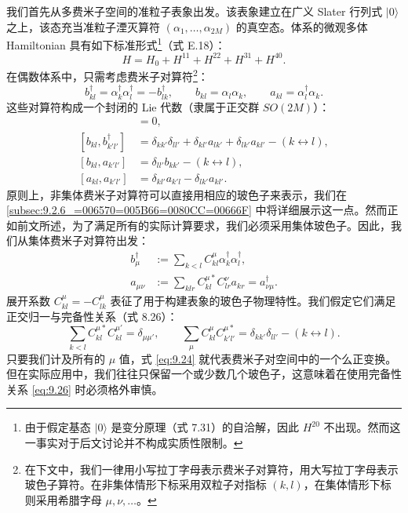 我们首先从多费米子空间的准粒子表象出发。该表象建立在广义 Slater 行列式 $|0\rangle$ 之上，该态充当准粒子湮灭算符
$(\alpha_{1},\ldots,\alpha_{2M})$ 的真空态。体系的微观多体 Hamiltonian 具有如下标准形式\footnote{由于假定基态 $|0\rangle$ 是变分原理（式 7.31）的自洽解，因此 $H^{20}$ 不出现。然而这一事实对于后文讨论并不构成实质性限制。}（式
E.18）：
\begin{equation}
H=H_{0}+H^{11}+H^{22}+H^{31}+H^{40}.\label{eq:9.21}
\end{equation}
在偶数体系中，只需考虑费米子对算符\footnote{在下文中，我们一律用小写拉丁字母表示费米子对算符，用大写拉丁字母表示玻色子算符。在非集体情形下标采用双粒子对指标 $(k,l)$，在集体情形下标则采用希腊字母
$\mu,\nu,\ldots$。}：
\begin{equation}
b^{\dagger}_{kl}=\alpha^{\dagger}_{k}\alpha^{\dagger}_{l}=-b^{\dagger}_{lk},\qquad b_{kl}=\alpha_{l}\alpha_{k},\qquad a_{kl}=\alpha^{\dagger}_{l}\alpha_{k}.\label{eq:9.22}
\end{equation}
这些对算符构成一个封闭的 Lie 代数（隶属于正交群 $SO(2M)$）：
\begin{align}
[b_{kl},b_{k'l'}] & =0,\label{eq:9.23a}\\{}
[b_{kl},b^{\dagger}_{k'l'}] & =\delta_{kk'}\delta_{ll'}+\delta_{kl'}a_{lk'}+\delta_{lk'}a_{kl'}-(k\leftrightarrow l),\label{eq:9.23b}\\{}
[b_{kl},a_{k'l'}] & =\delta_{ll'}b_{kk'}-(k\leftrightarrow l),\label{eq:9.23c}\\{}
[a_{kl},a_{k'l'}] & =\delta_{kl'}a_{k'l}-\delta_{lk'}a_{kl'}.\label{eq:9.23d}
\end{align}
原则上，非集体费米子对算符可以直接用相应的玻色子来表示，我们在 \ref{subsec:9.2.6_=006570=005B66=0080CC=00666F}
中将详细展示这一点。然而正如前文所述，为了满足所有的实际计算要求，我们必须采用集体玻色子。因此，我们从集体费米子对算符出发：
\begin{align}
b^{\dagger}_{\mu} & :=\sum_{k<l}C^{\mu}_{kl}\alpha^{\dagger}_{k}\alpha^{\dagger}_{l},\label{eq:9.24}\\
a_{\mu\nu} & :=\sum_{klr}C^{\mu*}_{kl}C^{\nu}_{lr}a_{kr}=a^{\dagger}_{\nu\mu}.\label{eq:9.25}
\end{align}
展开系数 $C^{\mu}_{kl}=-C^{\mu}_{lk}$ 表征了用于构建表象的玻色子物理特性。我们假定它们满足正交归一与完备性关系（式
8.26）：
\begin{equation}
\sum_{k<l}C^{\mu*}_{kl}C^{\mu'}_{kl}=\delta_{\mu\mu'},\qquad\sum_{\mu}C^{\mu}_{kl}C^{\mu*}_{k'l'}=\delta_{kk'}\delta_{ll'}-(k\leftrightarrow l).\label{eq:9.26}
\end{equation}
只要我们计及所有的 $\mu$ 值，式 \ref{eq:9.24} 就代表费米子对空间中的一个么正变换。但在实际应用中，我们往往只保留一个或少数几个玻色子，这意味着在使用完备性关系
\ref{eq:9.26} 时必须格外审慎。

